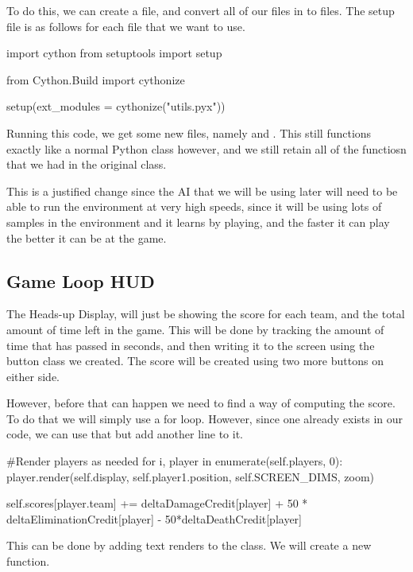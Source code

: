 To do this, we can create a  file, and convert all of our files in to  files. The setup file is as follows for each  file that we want to use.

\begin{mpy}
import cython
from setuptools import setup

from Cython.Build import cythonize

setup(ext_modules = cythonize("utils.pyx"))
\end{mpy}

Running this code, we get some new files, namely  and . This still functions exactly like a normal Python class however, and we still retain all of the functiosn that we had in the original class.

\vs
This is a justified change since the AI that we will be using later will need to be able to run the environment at very high speeds, since it will be using lots of samples in the environment and it learns by playing, and the faster it can play the better it can be at the game.

\subsection{Game Loop HUD}

The Heads-up Display, will just be showing the score for each team, and the total amount of time left in the game. This will be done by tracking the amount of time that has passed in seconds, and then writing it to the screen using the button class we created. The score will be created using two more buttons on either side.

\vs
However, before that can happen we need to find a way of computing the score. To do that we will simply use a for loop. However, since one already exists in our code, we can use that but add another line to it.

\vs
\begin{mpy}
            #Render players as needed
            for i, player in enumerate(self.players, 0):
                player.render(self.display, self.player1.position, self.SCREEN_DIMS, zoom)

                self.scores[player.team] += deltaDamageCredit[player] + 50 * deltaEliminationCredit[player] - 50*deltaDeathCredit[player]

\end{mpy}

This can be done by adding text renders to the  class. We will create a new function. 

